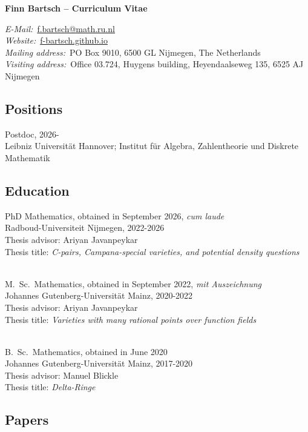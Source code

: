 \documentclass[paper=a4,fontsize=10pt,DIV=12,BCOR=3mm,pdftex]{scrartcl}
\begin{document}
\thispagestyle{empty}
{
\centering
\Large \textbf{Finn Bartsch -- Curriculum Vitae} \par
}
\bigskip \par
\textit{E-Mail:}~\href{mailto:f.bartsch@math.ru.nl}{f.bartsch@math.ru.nl} \\
\textit{Website:}~\href{https://f-bartsch.github.io}{f-bartsch.github.io} \\
\textit{Mailing address:}~PO Box 9010, 6500 GL Nijmegen, The Netherlands \\
\textit{Visiting address:}~Office 03.724, Huygens building, Heyendaalseweg 135, 6525 AJ Nijmegen


\subsection*{Positions}
Postdoc, 2026- \\
Leibniz Universität Hannover; Institut für Algebra, Zahlentheorie und Diskrete Mathematik


\subsection*{Education}
PhD Mathematics, obtained in September 2026, \emph{cum laude} \\
Radboud-Universiteit Nijmegen, 2022-2026 \\
Thesis advisor: Ariyan Javanpeykar \\
Thesis title: \textit{C-pairs, Campana-special varieties, and potential density questions} \\
~\par

M.~Sc.~Mathematics, obtained in September 2022, \emph{mit Auszeichnung} \\
Johannes Gutenberg-Universität Mainz, 2020-2022 \\
Thesis advisor: Ariyan Javanpeykar \\
Thesis title: \textit{Varieties with many rational points over function fields} \\
~\par

B.~Sc.~Mathematics, obtained in June 2020 \\
Johannes Gutenberg-Universität Mainz, 2017-2020 \\
Thesis advisor: Manuel Blickle \\
Thesis title: \textit{Delta-Ringe}


\subsection*{Papers}
\end{document}
